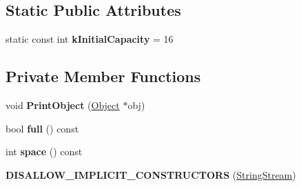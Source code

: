 \subsection*{Static Public Attributes}
\begin{DoxyCompactItemize}
\item 
static const int {\bfseries k\+Initial\+Capacity} = 16\hypertarget{classv8_1_1internal_1_1_string_stream_a5893ecef00152a5d11918d88d6d1ff02}{}\label{classv8_1_1internal_1_1_string_stream_a5893ecef00152a5d11918d88d6d1ff02}

\end{DoxyCompactItemize}
\subsection*{Private Member Functions}
\begin{DoxyCompactItemize}
\item 
void {\bfseries Print\+Object} (\hyperlink{classv8_1_1internal_1_1_object}{Object} $\ast$obj)\hypertarget{classv8_1_1internal_1_1_string_stream_adddc8658990bdb4ac1b025b636e792df}{}\label{classv8_1_1internal_1_1_string_stream_adddc8658990bdb4ac1b025b636e792df}

\item 
bool {\bfseries full} () const \hypertarget{classv8_1_1internal_1_1_string_stream_aa1949268af3887b5970c7db294f5994c}{}\label{classv8_1_1internal_1_1_string_stream_aa1949268af3887b5970c7db294f5994c}

\item 
int {\bfseries space} () const \hypertarget{classv8_1_1internal_1_1_string_stream_a3ca02c7c3f9dd4449eb7cda7cfb60b82}{}\label{classv8_1_1internal_1_1_string_stream_a3ca02c7c3f9dd4449eb7cda7cfb60b82}

\item 
{\bfseries D\+I\+S\+A\+L\+L\+O\+W\+\_\+\+I\+M\+P\+L\+I\+C\+I\+T\+\_\+\+C\+O\+N\+S\+T\+R\+U\+C\+T\+O\+RS} (\hyperlink{classv8_1_1internal_1_1_string_stream}{String\+Stream})\hypertarget{classv8_1_1internal_1_1_string_stream_a6e3c1ec508c31a27d3e74d5921bd0d35}{}\label{classv8_1_1internal_1_1_string_stream_a6e3c1ec508c31a27d3e74d5921bd0d35}

\end{DoxyCompactItemize}
